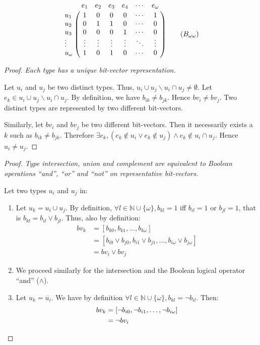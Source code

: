 \documentclass[format=sigconf]{acmart}
\theoremstyle{definition}
\begin{document}
\[
  \bordermatrix{
            &e_1   &e_2   &e_3   &e_4   &\cdots&e_\omega \cr
    u_1     &1     &0     &0     &0     &\cdots&1       \cr
    u_2     &0     &1     &1     &0     &\cdots&0       \cr
    u_3     &0     &0     &0     &1     &\cdots&0       \cr
    \vdots  &\vdots&\vdots&\vdots&\vdots&\ddots&\vdots  \cr
    u_\omega&1     &0     &1     &0     &\cdots&0
  } \label{eq:matrix} \tag{$B_{\omega\omega}$}
\]

\begin{proof}
  \emph{\small Each type has a unique bit-vector representation.}
  \newcommand{\reldiff}[2]{#1 \cup #2 \backslash #1 \cap #2}

  Let $u_i$ and $u_j$ be two distinct types. Thus, $\reldiff{u_i}{u_j} \neq \emptyset$.
  Let $e_k \in \reldiff{u_i}{u_j}$. By definition, we have $b_{ik} \neq b_{jk}$.
  Hence $bv_i \neq bv_j$. Two distinct types are represented by two different
  bit-vectors.

  Similarly, let $bv_i$ and $bv_j$ be two different bit-vectors. Then it
  necessarily exists a $k$ such as $b_{ik} \neq b_{jk}$. Therefore
  $\exists e_k, \left(e_k \notin u_i \vee e_k \notin u_j\right) \wedge e_k
  \notin u_i \cap u_j$. Hence $u_i \neq u_j$. \qedhere
\end{proof}

\begin{proof}
  \emph{\small Type intersection, union and complement are equivalent to Boolean
    operations ``and'', ``or'' and ``not'' on representative bit-vectors.}

  Let two types $u_i$ and $u_j$ in:
  \begin{enumerate}
  \item Let $u_k = u_i \cup u_j$. By definition, $\forall l \in \mathbb{N} \cup
    \{\omega\}, b_{kl} = 1$ iff $b_{il} = 1$ or $b_{jl} = 1$, that is $b_{kl} =
    b_{il} \vee b_{jl}$. Thus, also by definition:
    \begin{align*}
      bv_k &= \left[b_{k0}, b_{k1}, \dots, b_{k\omega}\right]  \\
           &= \left[b_{i0} \vee b_{j0}, b_{i1} \vee b_{j1}, \dots, b_{i\omega} \vee b_{j\omega}\right]  \\
           &= bv_i \vee bv_j
    \end{align*}
  \item We proceed similarly for the intersection and the Boolean logical operator
    ``and'' ($\wedge$).
  \item Let $u_k = \overline{u_i}$. We have by definition $\forall l \in
    \mathbb{N} \cup \{\omega\}, b_{kl} = \neg b_{il}$. Then:
    \begin{align*}
      bv_k &= \left[\neg b_{i0}, \neg b_{i1}, \dots, \neg b_{i\omega}\right]  \\
           &= \neg bv_i \qedhere
    \end{align*}
  \end{enumerate}
\end{proof}
\end{document}
